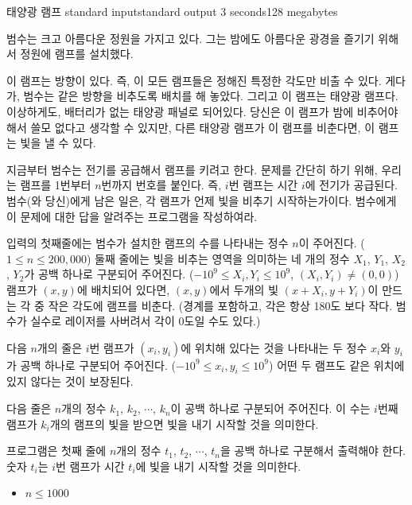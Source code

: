 \begin{problem}{태양광 램프}
	{standard input}{standard output}
	{3 seconds}{128 megabytes}{}
	
	
	범수는 크고 아름다운 정원을 가지고 있다. 그는 밤에도 아름다운 광경을 즐기기 위해서 정원에 램프를 설치했다.
	
	이 램프는 방향이 있다. 즉, 이 모든 램프들은 정해진 특정한 각도만 비출 수 있다. 게다가, 범수는 같은 방향을 비추도록 배치를 해 놓았다. 그리고 이 램프는 태양광 램프다. 이상하게도, 배터리가 없는 태양광 패널로 되어있다. 당신은 이 램프가 밤에 비추어야 해서 쓸모 없다고 생각할 수 있지만, 다른 태양광 램프가 이 램프를 비춘다면, 이 램프는 빛을 낼 수 있다.
	
	지금부터 범수는 전기를 공급해서 램프를 키려고 한다. 문제를 간단히 하기 위해, 우리는 램프를 1번부터 $n$번까지 번호를 붙인다. 즉, $i$번 램프는 시간 $i$에 전기가 공급된다. 범수(와 당신)에게 남은 일은, 각 램프가 언제 빛을 비추기 시작하는가이다. 범수에게 이 문제에 대한 답을 알려주는 프로그램을 작성하여라.
	 
	\InputFile
	
	입력의 첫째줄에는 범수가 설치한 램프의 수를 나타내는 정수 $n$이 주어진다. ($1 \le n \le 200,000$) 둘째 줄에는 빛을 비추는 영역을 의미하는 네 개의 정수 $X_1$, $Y_1$, $X_2$, $Y_2$가 공백 하나로 구분되어 주어진다. ($-10^9 \le X_i, Y_i \le 10^9$, $(X_i, Y_i) \neq (0,0)$)
	램프가 $(x, y)$에 배치되어 있다면, $(x, y)$에서 두개의 빛 $(x+X_i, y+Y_i)$이 만드는 각 중 작은 각도에 램프를 비춘다. (경계를 포함하고, 각은 항상 180도 보다 작다. 범수가 실수로 레이저를 사버려서 각이 0도일 수도 있다.)
	
	다음 $n$개의 줄은 $i$번 램프가 $(x_i, y_i)$에 위치해 있다는 것을 나타내는 두 정수 $x_i$와 $y_i$가 공백 하나로 구분되어 주어진다. ($-10^9 \le x_i, y_i \le 10^9$) 어떤 두 램프도 같은 위치에 있지 않다는 것이 보장된다.
	
	다음 줄은 $n$개의 정수 $k_1$, $k_2$, $\cdots$, $k_n$이 공백 하나로 구분되어 주어진다. 이 수는 $i$번째 램프가 $k_i$개의 램프의 빛을 받으면 빛을 내기 시작할 것을 의미한다.

	
	\OutputFile
	프로그램은 첫째 줄에 $n$개의 정수 $t_1$, $t_2$, $\cdots$, $t_n$을 공백 하나로 구분해서 출력해야 한다. 숫자 $t_i$는 $i$번 램프가 시간 $t_i$에 빛을 내기 시작할 것을 의미한다.
	
	\begin{itemize}
		\item $n \le 1000$
	\end{itemize}
	
	

\end{problem}
